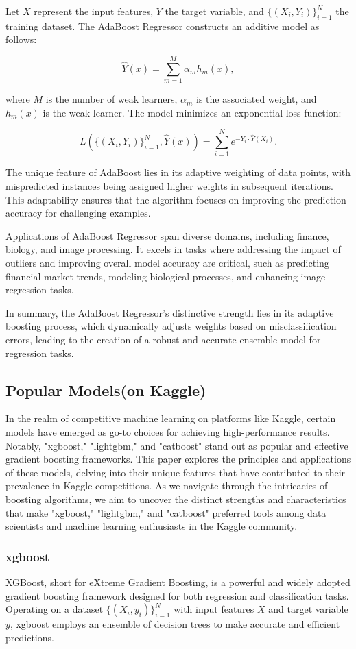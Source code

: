 \documentclass[twocolumn]{article}
\begin{document}
Let \(X\) represent the input features, \(Y\) the target variable, and \(\{ (X_i, Y_i) \}_{i=1}^{N}\) the training dataset. The AdaBoost Regressor constructs an additive model as follows:

\[ \hat{Y}(x) = \sum_{m=1}^{M} \alpha_m h_m(x), \]

where \(M\) is the number of weak learners, \(\alpha_m\) is the associated weight, and \(h_m(x)\) is the weak learner. The model minimizes an exponential loss function:

\[ L(\{ (X_i, Y_i) \}_{i=1}^{N}, \hat{Y}(x)) = \sum_{i=1}^{N} e^{-Y_i \cdot \hat{Y}(X_i)}. \]

The unique feature of AdaBoost lies in its adaptive weighting of data points, with mispredicted instances being assigned higher weights in subsequent iterations. This adaptability ensures that the algorithm focuses on improving the prediction accuracy for challenging examples.

Applications of AdaBoost Regressor span diverse domains, including finance, biology, and image processing. It excels in tasks where addressing the impact of outliers and improving overall model accuracy are critical, such as predicting financial market trends, modeling biological processes, and enhancing image regression tasks.

In summary, the AdaBoost Regressor's distinctive strength lies in its adaptive boosting process, which dynamically adjusts weights based on misclassification errors, leading to the creation of a robust and accurate ensemble model for regression tasks.

	\subsection{Popular Models(on Kaggle)}
In the realm of competitive machine learning on platforms like Kaggle, certain models have emerged as go-to choices for achieving high-performance results. Notably, "xgboost," "lightgbm," and "catboost" stand out as popular and effective gradient boosting frameworks. This paper explores the principles and applications of these models, delving into their unique features that have contributed to their prevalence in Kaggle competitions. As we navigate through the intricacies of boosting algorithms, we aim to uncover the distinct strengths and characteristics that make "xgboost," "lightgbm," and "catboost" preferred tools among data scientists and machine learning enthusiasts in the Kaggle community.
		\subsubsection{xgboost}
XGBoost, short for eXtreme Gradient Boosting, is a powerful and widely adopted gradient boosting framework designed for both regression and classification tasks. Operating on a dataset \(\{(X_i, y_i)\}_{i=1}^{N}\) with input features \(X\) and target variable \(y\), xgboost employs an ensemble of decision trees to make accurate and efficient predictions.
\end{document}
